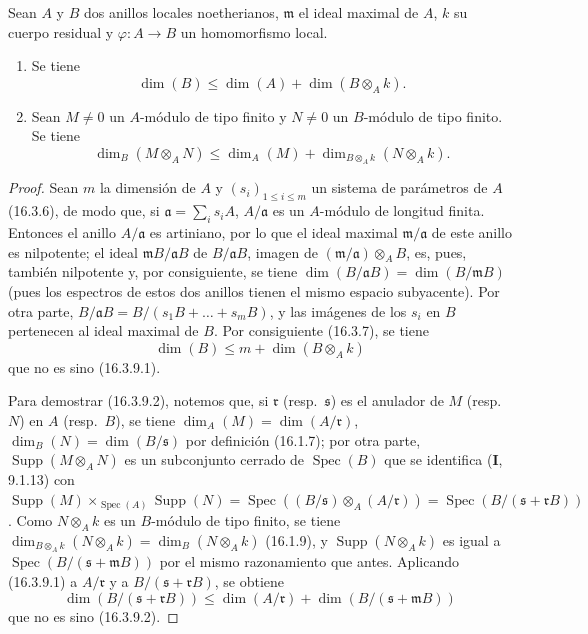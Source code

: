 \begin{proposition}[16.3.9]
\label{0.16.3.9-fr}
Sean $A$ y $B$ dos anillos locales noetherianos, $\mathfrak{m}$ el ideal
maximal de $A$, $k$ su cuerpo residual y $\varphi:A\to B$ un homomorfismo
local.
\begin{enumerate}
  \item[\rm{(i)}] Se tiene
  \begin{equation}
  \label{0.16.3.9.1-fr}
  \tag{16.3.9.1}
    \dim(B)\leq\dim(A)+\dim(B\otimes_A k).
  \end{equation}
  \item[\rm{(ii)}] Sean $M\neq0$ un $A$-módulo de tipo finito y $N\neq0$ un
  $B$-módulo de tipo finito. Se tiene
  \begin{equation}
  \label{0.16.3.9.2-fr}
  \tag{16.3.9.2}
    \dim_B(M\otimes_A N)
    \leq\dim_A(M)+\dim_{B\otimes_A k}(N\otimes_A k).
  \end{equation}
\end{enumerate}
\end{proposition}

\begin{proof}
Sean $m$ la dimensión de $A$ y $(s_i)_{1\leq i\leq m}$ un sistema de
parámetros de $A$ (16.3.6), de modo que, si
$\mathfrak{a}=\sum_i s_iA$, $A/\mathfrak{a}$ es un $A$-módulo de longitud
finita. Entonces el anillo $A/\mathfrak{a}$ es artiniano, por lo que el ideal
maximal $\mathfrak{m}/\mathfrak{a}$ de este anillo es nilpotente; el ideal
$\mathfrak{m}B/\mathfrak{a}B$ de $B/\mathfrak{a}B$, imagen de
$(\mathfrak{m}/\mathfrak{a})\otimes_A B$, es, pues, también nilpotente y, por
consiguiente, se tiene
$\dim(B/\mathfrak{a}B)=\dim(B/\mathfrak{m}B)$ (pues los espectros de estos dos
anillos tienen el mismo espacio subyacente). Por otra parte,
$B/\mathfrak{a}B=B/(s_1B+\ldots+s_mB)$, y las imágenes de los $s_i$ en $B$
pertenecen al ideal maximal de $B$. Por consiguiente (16.3.7), se tiene
\[
  \dim(B)\leq m+\dim(B\otimes_A k)
\]
que no es sino (16.3.9.1).

Para demostrar (16.3.9.2), notemos que, si $\mathfrak{r}$
(resp.~$\mathfrak{s}$) es el anulador de $M$ (resp.~$N$)
en $A$ (resp.~$B$), se tiene
$\dim_A(M)=\dim(A/\mathfrak{r})$, $\dim_B(N)=\dim(B/\mathfrak{s})$ por
definición (16.1.7); por otra parte, $\operatorname{Supp}(M\otimes_A N)$ es un
subconjunto cerrado de $\operatorname{Spec}(B)$ que se identifica (\textbf I, 9.1.13)
con
$\operatorname{Supp}(M)\times_{\operatorname{Spec}(A)}\operatorname{Supp}(N)=\operatorname{Spec}((B/\mathfrak{s})\otimes_A(A/\mathfrak{r}))=\operatorname{Spec}(B/(\mathfrak{s}+\mathfrak{r}B))$.
Como $N\otimes_A k$ es un $B$-módulo de tipo finito, se tiene
$\dim_{B\otimes_A k}(N\otimes_A k)=\dim_B(N\otimes_A k)$ (16.1.9), y
$\operatorname{Supp}(N\otimes_A k)$ es igual a
$\operatorname{Spec}(B/(\mathfrak{s}+\mathfrak{m}B))$ por el mismo
razonamiento que antes. Aplicando (16.3.9.1) a $A/\mathfrak{r}$ y a
$B/(\mathfrak{s}+\mathfrak{r}B)$, se obtiene
\[
  \dim(B/(\mathfrak{s}+\mathfrak{r}B))
  \leq\dim(A/\mathfrak{r})+
  \dim(B/(\mathfrak{s}+\mathfrak{m}B))
\]
que no es sino (16.3.9.2).
\end{proof}

